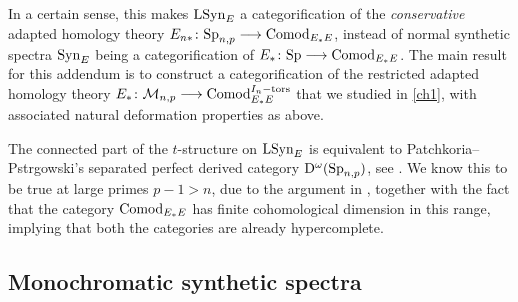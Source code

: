 In a certain sense, this makes $\mathrm{LSyn}_{E}$ a categorification of the \emph{conservative} adapted homology theory $E_{n*}\colon \mathrm{Sp}_{n,p}\longrightarrow \mathrm{Comod}_{E_*E}$, instead of normal synthetic spectra $\mathrm{Syn}_{E}$ being a categorification of $E_* \colon \mathrm{Sp}\longrightarrow \mathrm{Comod}_{E_*E}$. The main result for this addendum is to construct a categorification of the restricted adapted homology theory $E_{*}\colon \mathcal{M}_{n,p} \longrightarrow \mathrm{Comod}_{E_*E}^{I_n-\mathrm{tors}}$ that we studied in \cref{ch1}, with associated natural deformation properties as above. 





\begin{conjecture}
    The connected part of the $t$-structure on $\mathrm{LSyn}_{E}$ is equivalent to Patchkoria--Pstr\a{}gowski's separated perfect derived category $\mathrm{D}^\omega(\mathrm{Sp}_{n,p})$, see \cite[6.49]{patchkoria-pstragowski_2021}. We know this to be true at large primes $p-1>n$, due to the argument in \cite[6.57]{patchkoria-pstragowski_2021}, together with the fact that the category $\mathrm{Comod}_{E_*E}$ has finite cohomological dimension in this range, implying that both the categories are already hypercomplete.
\end{conjecture}




\subsection{Monochromatic synthetic spectra}

